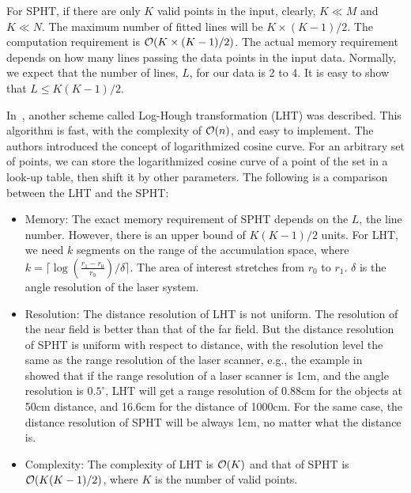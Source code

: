 \documentclass[]{spie}
\begin{document}
    For SPHT, if there are only $K$ valid points in the input, clearly, $K\ll M$ and $ K \ll N$. The maximum number of fitted lines will be $ K\times (K-1)/2$. The computation requirement is ${\cal O}(K\times (K-1)/2) $. The actual memory requirement depends on how many lines passing the data points in the input data. Normally, we expect that the number of lines, $L$, for our data is 2 to 4. It is easy to show that $L\leq K(K-1)/2$. 

    In~\cite{GieslerLogHough}, another scheme called Log-Hough transformation (LHT) was described. This algorithm is fast, with the complexity of ${\cal O}(n)$, and easy to implement. The authors introduced the concept of logarithmized cosine curve. For an arbitrary set of points, we can store the logarithmized cosine curve of a point of the set in a look-up table, then shift it by other parameters. The following is a comparison between the LHT and the SPHT:\\
\begin{itemize}
    \item Memory: The exact memory requirement of SPHT depends on the $L$, the line number. However, there is an upper bound of $K(K-1)/2$ units. For LHT, we need $k$ segments on the range of the accumulation space, where $ k=\lceil \log(\frac{r_1-r_0}{r_0})/\delta\rceil.$ The area of interest stretches from $r_0$ to $r_1$. $\delta$ is the angle resolution of the laser system.
    \item Resolution: The distance resolution of LHT is not uniform. The resolution of the near field is better than that of the far field. But the distance resolution of SPHT is uniform with respect to distance, with the resolution level the same as the range resolution of the laser scanner, e.g., the example in~\cite{GieslerLogHough} showed that if the range resolution of a laser scanner is 1cm, and the angle resolution is $0.5^\circ$, LHT will get a range resolution of 0.88cm for the objects at 50cm distance, and 16.6cm for the distance of 1000cm. For the same case, the distance resolution of SPHT will be always 1cm, no matter what the distance is.
    \item Complexity: The complexity of LHT is ${\cal O}(K)$ and that of SPHT is ${\cal O}(K(K-1)/2)$, where $K$ is the number of valid points. 
\end{itemize}    
\end{document}
